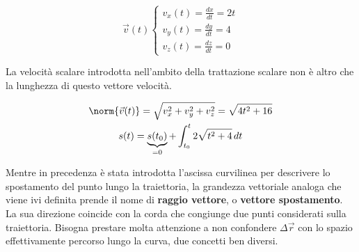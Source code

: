 \[
	\vec{v}(t)
		\begin{cases}
			v_x(t)=\frac{dx}{dt}=2t \\
			v_y(t)=\frac{dy}{dt}=4 \\
			v_z(t)=\frac{dz}{dt}=0
		\end{cases}
\]

La velocità scalare introdotta nell'ambito della trattazione scalare non è altro che la lunghezza di questo vettore velocità.

\begin{gather*}
	\norm{\vec{v}(t)}=\sqrt{v_x^2+v_y^2+v_z^2}=\sqrt{4t^2+16} \\
	s(t)=\underbrace{s(t_0)}_{=0}+\int^t_{t_0} 2\sqrt{t^2+4}\,dt
\end{gather*}

Mentre in precedenza è stata introdotta l'ascissa curvilinea per descrivere lo spostamento del punto lungo la traiettoria, la grandezza vettoriale analoga che viene ivi definita prende il nome di \textbf{raggio vettore}, o \textbf{vettore spostamento}. La sua direzione coincide con la corda che congiunge due punti considerati sulla traiettoria. Bisogna prestare molta attenzione a non confondere $\Delta\vec{r}$ con lo spazio effettivamente percorso lungo la curva, due concetti ben diversi.

